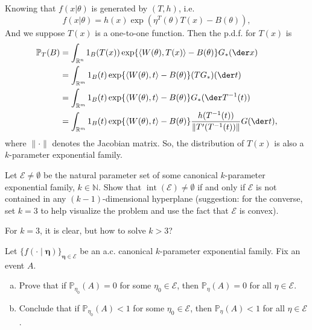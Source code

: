 \begin{solution}
	Knowing that $f(x|\theta)$ is generated by $(T,h)$, i.e.
	\[
		f(x|\theta)=h(x)\exp\left(\eta^T(\theta)T(x)-B(\theta)\right),
	\]
	And we suppose $T(x)$ is a one-to-one function. Then the p.d.f. for $T(x)$ is
	\[
		\begin{aligned}
			\mathbb{P}_{T}(B)&=\int_{\mathbb{R}^{n}} 1_{B}(T( x)) \exp \{\langle W(\theta), T( x)\rangle-B(\theta)\} G_{*}(\der  x)\\
			&=\int_{\mathbb{R}^m}1_{B}(t) \exp \{\langle W(\theta), t\rangle-B(\theta)\}( TG_{*})(\der t)\\
			&=\int_{\mathbb{R}^m}1_{B}(t) \exp \{\langle W(\theta), t\rangle-B(\theta)\}G_*(\der T^{-1}(t))\\
			&=\int_{\mathbb{R}^m}1_{B}(t) \exp \{\langle W(\theta), t\rangle-B(\theta)\}\frac{h(T^{-1}(t))}{\|T'(T^{-1}(t))\|}G(\der t),
		\end{aligned}
	\]
	where $\|\cdot\|$ denotes the Jacobian matrix. So, the distribution of $T(x)$ is also a $k$-parameter exponential family.
\end{solution}

\begin{ex}
	Let \(\mathcal{E} \neq \emptyset\) be the natural parameter set of some canonical \(k\)-parameter exponential family, \(k \in \mathbb{N}\). Show that \(\operatorname{int}(\mathcal{E}) \neq \emptyset\) if and only if \(\mathcal{E}\) is not contained in any \((k-1)\)-dimensional hyperplane (suggestion: for the converse, set \(k=3\) to help visualize the problem and use the fact that \(\mathcal{E}\) is convex).
\end{ex}

\begin{solution}
	For $k=3$, it is clear, but how to solve $k>3$?
\end{solution}

\begin{ex}
	Let \(\{f(\cdot \mid \boldsymbol{\eta})\}_{\boldsymbol{\eta} \in \mathcal{E}}\) be an a.c. canonical \(k\)-parameter exponential family. Fix an event \(A\).
	\begin{enumerate}[(a)]
		\item Prove that if \(\mathbb{P}_{\eta_{0}}(A)=0\) for some \(\eta_{0} \in \mathcal{E}\), then \(\mathbb{P}_{\eta}(A)=0\) for all \(\eta \in \mathcal{E}\).
		\item Conclude that if \(\mathbb{P}_{\eta_{0}}(A)<1\) for some \(\eta_{0} \in \mathcal{E}\), then \(\mathbb{P}_{\eta}(A)<1\) for all \(\eta \in \mathcal{E}\).
	\end{enumerate}
\end{ex}


